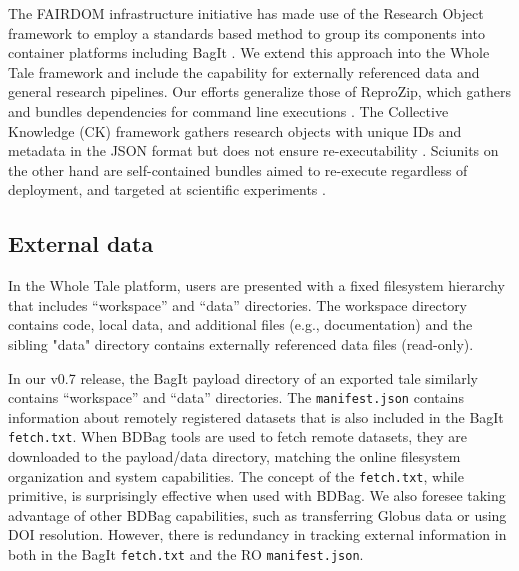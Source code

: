 \documentclass[conference]{IEEEtran}
\begin{document}
The FAIRDOM infrastructure initiative has made use of the Research
Object framework to employ a standards based method to group its
components into container platforms including BagIt
\cite{Stanford2016}. We extend this approach into the Whole Tale
framework and include the capability for externally referenced data
and general research pipelines. 
Our efforts generalize those of ReproZip, which gathers and bundles
dependencies for command line executions \cite{Chirigati2016}.
The Collective Knowledge (CK) framework gathers research objects with
unique IDs and metadata in the JSON format but does not ensure
re-executability \cite{fursin2018}. Sciunits on the other hand are
self-contained bundles aimed to re-execute regardless of  
deployment, and targeted at scientific experiments \cite{That2017,
  Yuan2018}.

\subsection{External data}
In the Whole Tale platform, users are presented with a fixed filesystem hierarchy that includes  ``workspace'' and ``data'' directories. The workspace directory contains code, local data, and additional files (e.g., documentation) and the sibling "data" directory contains externally referenced data files (read-only).

In our v0.7 release, the BagIt payload directory of an exported tale similarly contains ``workspace'' and ``data'' directories. The \texttt{manifest.json} contains information about remotely registered datasets that is also included in the BagIt \texttt{fetch.txt}. When BDBag tools are used to fetch remote datasets, they are downloaded to the payload/data directory, matching the online filesystem organization and system capabilities. The concept of the \texttt{fetch.txt}, while primitive, is surprisingly effective when used with BDBag. We also foresee taking advantage of other BDBag capabilities, such as transferring Globus data or using DOI resolution. However, there is redundancy in tracking external information in both in the BagIt \texttt{fetch.txt} and the RO \texttt{manifest.json}. 
\end{document}
